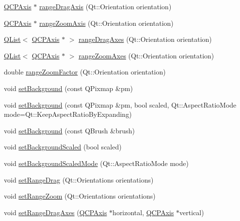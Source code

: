 \begin{DoxyCompactItemize}
\item 
\hyperlink{class_q_c_p_axis}{Q\+C\+P\+Axis} $\ast$ \hyperlink{class_q_c_p_axis_rect_a6d7c22cfc54fac7a3d6ef80b133a8574}{range\+Drag\+Axis} (Qt\+::\+Orientation orientation)
\item 
\hyperlink{class_q_c_p_axis}{Q\+C\+P\+Axis} $\ast$ \hyperlink{class_q_c_p_axis_rect_a679c63f2b8daccfe6ec5110dce3dd3b6}{range\+Zoom\+Axis} (Qt\+::\+Orientation orientation)
\item 
\hyperlink{class_q_list}{Q\+List}$<$ \hyperlink{class_q_c_p_axis}{Q\+C\+P\+Axis} $\ast$ $>$ \hyperlink{class_q_c_p_axis_rect_aae5f99a044ca911685a306f01b7ff941}{range\+Drag\+Axes} (Qt\+::\+Orientation orientation)
\item 
\hyperlink{class_q_list}{Q\+List}$<$ \hyperlink{class_q_c_p_axis}{Q\+C\+P\+Axis} $\ast$ $>$ \hyperlink{class_q_c_p_axis_rect_a86aac0f435f209d60dacd22cda10c104}{range\+Zoom\+Axes} (Qt\+::\+Orientation orientation)
\item 
double \hyperlink{class_q_c_p_axis_rect_ae4e6c4d143aacc88d2d3c56f117c2fe1}{range\+Zoom\+Factor} (Qt\+::\+Orientation orientation)
\item 
void \hyperlink{class_q_c_p_axis_rect_af615ab5e52b8e0a9a0eff415b6559db5}{set\+Background} (const Q\+Pixmap \&pm)
\item 
void \hyperlink{class_q_c_p_axis_rect_ac48a2d5d9b7732e73b86605c69c5e4c1}{set\+Background} (const Q\+Pixmap \&pm, bool scaled, Qt\+::\+Aspect\+Ratio\+Mode mode=Qt\+::\+Keep\+Aspect\+Ratio\+By\+Expanding)
\item 
void \hyperlink{class_q_c_p_axis_rect_a22a22b8668735438dc06f9a55fe46b33}{set\+Background} (const Q\+Brush \&brush)
\item 
void \hyperlink{class_q_c_p_axis_rect_ae6d36c3e0e968ffb991170a018e7b503}{set\+Background\+Scaled} (bool scaled)
\item 
void \hyperlink{class_q_c_p_axis_rect_a5ef77ea829c9de7ba248e473f48f7305}{set\+Background\+Scaled\+Mode} (Qt\+::\+Aspect\+Ratio\+Mode mode)
\item 
void \hyperlink{class_q_c_p_axis_rect_ae6aef2f7211ba6097c925dcd26008418}{set\+Range\+Drag} (Qt\+::\+Orientations orientations)
\item 
void \hyperlink{class_q_c_p_axis_rect_a7960a9d222f1c31d558b064b60f86a31}{set\+Range\+Zoom} (Qt\+::\+Orientations orientations)
\item 
void \hyperlink{class_q_c_p_axis_rect_a648cce336bd99daac4a5ca3e5743775d}{set\+Range\+Drag\+Axes} (\hyperlink{class_q_c_p_axis}{Q\+C\+P\+Axis} $\ast$horizontal, \hyperlink{class_q_c_p_axis}{Q\+C\+P\+Axis} $\ast$vertical)

\end{DoxyCompactItemize}

